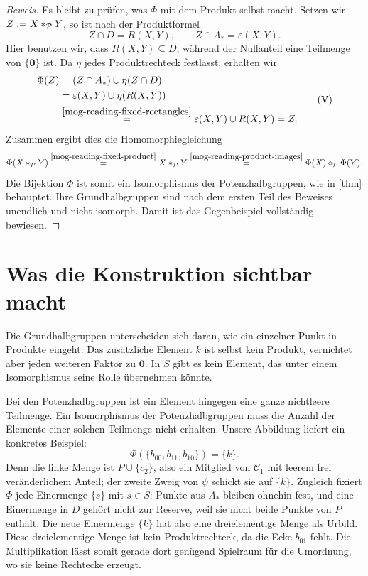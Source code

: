 \begin{proof}[Beweis]
Es bleibt zu prüfen, was \(\Phi\) mit dem Produkt selbst macht.
Setzen wir \(Z:=X\mathbin{\ast}_{\mathcal P}Y\), so ist nach der
Produktformel
\[
  Z\cap D=R(X,Y),\qquad
  Z\cap A_*=\varepsilon(X,Y).
\]
Hier benutzen wir, dass \(R(X,Y)\subseteq D\), während der
Nullanteil eine Teilmenge von \(\{\mathbf0\}\) ist.
Da \(\eta\) jedes Produktrechteck festlässt, erhalten wir
\begin{equation}
  \begin{aligned}
    \Phi(Z)
      &=(Z\cap A_*)\cup\eta(Z\cap D)\\
      &=\varepsilon(X,Y)\cup\eta(R(X,Y))\\
      &\overset{\eqref{mog-reading-fixed-rectangles}}{=}
        \varepsilon(X,Y)\cup R(X,Y)=Z.
  \end{aligned}
  \tag{V}\label{mog-reading-fixed-product}
\end{equation}
Zusammen ergibt dies die Homomorphiegleichung
\[
  \Phi(X\mathbin{\ast}_{\mathcal P}Y)
    \overset{\eqref{mog-reading-fixed-product}}{=}
      X\mathbin{\ast}_{\mathcal P}Y
    \overset{\eqref{mog-reading-product-images}}{=}
      \Phi(X)\mathbin{\diamond}_{\mathcal P}\Phi(Y).
\]
Die Bijektion \(\Phi\) ist somit ein Isomorphismus der
Potenzhalbgruppen, wie in
[thm]
behauptet. Ihre Grundhalbgruppen sind nach dem ersten Teil des
Beweises unendlich und nicht isomorph. Damit ist das Gegenbeispiel
vollständig bewiesen.
\end{proof}

\section*{Was die Konstruktion sichtbar macht}
Die Grundhalbgruppen unterscheiden sich daran, wie ein einzelner Punkt
in Produkte eingeht: Das zusätzliche Element \(k\) ist selbst kein
Produkt, vernichtet aber jeden weiteren Faktor zu \(\mathbf0\).
In \(S\) gibt es kein Element, das unter einem Isomorphismus seine
Rolle übernehmen könnte.

Bei den Potenzhalbgruppen ist ein Element hingegen eine ganze
nichtleere Teilmenge. Ein Isomorphismus der Potenzhalbgruppen muss
die Anzahl der Elemente einer solchen Teilmenge nicht erhalten.
Unsere Abbildung liefert ein konkretes Beispiel:
\[
  \Phi(\{b_{00},b_{11},b_{10}\})=\{k\}.
\]
Denn die linke Menge ist \(P\cup\{c_2\}\), also ein Mitglied
von \(\mathcal C_1\) mit leerem frei veränderlichem Anteil;
der zweite Zweig von \(\psi\) schickt sie auf \(\{k\}\).
Zugleich fixiert \(\Phi\) jede Einermenge \(\{s\}\) mit
\(s\in S\): Punkte aus \(A_*\) bleiben ohnehin fest, und eine
Einermenge in \(D\) gehört nicht zur Reserve, weil sie nicht beide
Punkte von \(P\) enthält. Die neue Einermenge \(\{k\}\) hat
also eine dreielementige Menge als Urbild.
Diese dreielementige Menge ist kein Produktrechteck, da die Ecke
\(b_{01}\) fehlt. Die Multiplikation lässt somit gerade dort
genügend Spielraum für die Umordnung, wo sie keine Rechtecke erzeugt.

